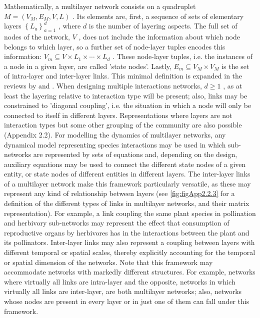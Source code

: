 Mathematically, a multilayer network consists on a quadruplet  $M=\left(V_M,E_M,V,L\right)$  . Its elements are, first, a sequence of sets of elementary layers  $\left\{L_a\right\}_{a=1}^d$  , where  $d$  is the number of layering aspects. The full set of nodes of the network,  $V$  , does not include the information about which node belongs to which layer, so a further set of node-layer tuples encodes this information:  $V_m{\subseteq}V\times L_1\times {\cdots}\times L_d$  . These node-layer tuples, i.e. the instances of a node in a given layer, are called {}'state nodes{}'. Lastly,  $E_m{\subseteq}V_M\times V_M$  is the set of intra-layer and inter-layer links. This minimal definition is expanded in the reviews by \cite{Kivela2014} and \cite{Pilosof2017}. When designing multiple interactions networks,  $d{\geq}1$  , as at least the layering relative to interaction type will be present; also, links may be constrained to {}'diagonal coupling{}', i.e. the situation in which a node will only be connected to itself in different layers. Representations where layers are not interaction types but some other grouping of the community are also possible (Appendix 2.2). For modelling the dynamics of multilayer networks, any dynamical model representing species interactions may be used in which sub-networks are represented by sets of equations and, depending on the design, auxiliary equations may be used to connect the different state nodes of a given entity, or state nodes of different entities in different layers. The inter-layer links of a multilayer network make this framework particularly versatile, as these may represent any kind of relationship between layers (see \cref{fig:figApp2.2.3} for a definition of the different types of links in multilayer networks, and their matrix representation). For example, a link coupling the same plant species in pollination and herbivory sub-networks may represent the effect that consumption of reproductive organs by herbivores has in the interactions between the plant and its pollinators. Inter-layer links may also represent a coupling between layers with different temporal or spatial scales, thereby explicitly accounting for the temporal or spatial dimension of the networks. Note that this framework may accommodate networks with markedly different structures. For example, networks where virtually all links are intra-layer and the opposite, networks in which virtually all links are inter-layer, are both multilayer networks; also, networks whose nodes are present in every layer or in just one of them can fall under this framework.

